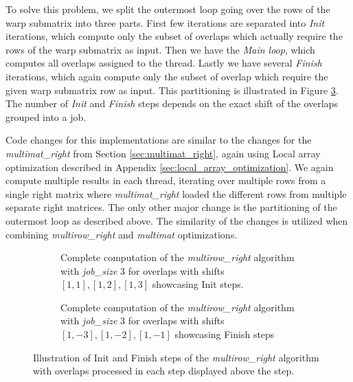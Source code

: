 To solve this problem, we split the outermost loop going over the rows of the warp submatrix into three parts. First few iterations are separated into \textit{Init} iterations, which compute only the subset of overlaps which actually require the rows of the warp submatrix as input. Then we have the \textit{Main loop}, which computes all overlaps assigned to the thread. Lastly we have several \textit{Finish} iterations, which again compute only the subset of overlap which require the given warp submatrix row as input. This partitioning is illustrated in Figure \ref{fig:multirow_right_steps}. The number of \textit{Init} and \textit{Finish} steps depends on the exact shift of the overlaps grouped into a job.

Code changes for this implementations are similar to the changes for the \textit{multimat\_right} from Section \ref{sec:multimat_right}, again using Local array optimization described in Appendix \ref{sec:local_array_optimization}. We again compute multiple results in each thread, iterating over multiple rows from a single right matrix where \textit{multimat\_right} loaded the different rows from multiple separate right matrices. The only other major change is the partitioning of the outermost loop as described above. The similarity of the changes is utilized when combining  \textit{multirow\_right} and \textit{multimat} optimizations.

\begin{figure}[ht]
	\centering	
	\begin{subfigure}{\textwidth}
		\centering
		\def\svgwidth{\textwidth}
		
		\caption{Complete computation of the \textit{multirow\_right} algorithm with \textit{job\_size} 3 for overlaps with shifts $[1, 1], [1, 2], [1, 3]$ showcasing Init steps.}
		\label{fig:multirow_init}
	\end{subfigure}
	\hfill
	\begin{subfigure}{\textwidth}
		\centering
		\def\svgwidth{\textwidth}
		
		\caption{Complete computation of the \textit{multirow\_right} algorithm with \textit{job\_size} 3 for overlaps with shifts $[1, -3], [1, -2], [1, -1]$ showcasing Finish steps}
		\label{fig:multirow_fini}
	\end{subfigure}
	
	\caption{Illustration of Init and Finish steps of the \textit{multirow\_right} algorithm with overlaps processed in each step displayed above the step.}
	\label{fig:multirow_right_steps}
\end{figure}



